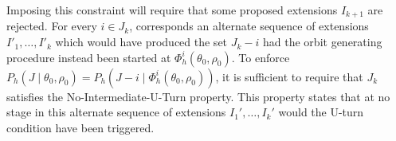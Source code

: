 \documentclass[letterpaper,11pt]{article}
\theoremstyle{plain}%
\theoremstyle{remark}
\begin{document}
Imposing this constraint will require that some proposed extensions $I_{k+1}$ are rejected. For every $i \in J_k$, corresponds an alternate sequence of extensions $I'_1, \dots, I'_k$ which would have produced the set $J_k - i$ had the orbit generating procedure instead been started at $\Phi_h^i(\theta_0, \rho_0)$.  To enforce $P_h(J \mid \theta_0, \rho_0) = P_h(J-i \mid \Phi_h^i(\theta_0, \rho_0))$, it is sufficient to require that $J_k$ satisfies the No-Intermediate-U-Turn property. This property states that at no stage in this alternate sequence of extensions $I_1', \dots, I_k'$ would the U-turn condition  have been triggered.




\end{document}
